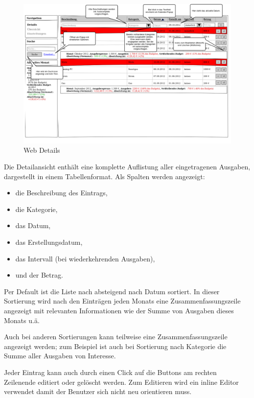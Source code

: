 \begin{figure}[htl]
\centering
\includegraphics[width=\textwidth]{img/web_details}
\caption{Web Details}
\label{fig:web_details}
\end{figure}

Die Detailansicht enthält eine komplette Auflistung aller eingetragenen Ausgaben, dargestellt
in einem Tabellenformat. Als Spalten werden angezeigt:

\begin{itemize}
    \item die Beschreibung des Eintrags,
    \item die Kategorie,
    \item das Datum,
    \item das Erstellungsdatum,
    \item das Intervall (bei wiederkehrenden Ausgaben),
    \item und der Betrag.
\end{itemize}

Per Default ist die Liste nach absteigend nach Datum sortiert. In dieser Sortierung wird nach den
Einträgen jeden Monats eine Zusammenfassungszeile angezeigt mit relevanten Informationen wie der Summe von Ausgaben dieses Monats u.ä.

Auch bei anderen Sortierungen kann teilweise eine Zusammenfassungszeile angezeigt werden; zum Beispiel ist auch
bei Sortierung nach Kategorie die Summe aller Ausgaben von Interesse.

Jeder Eintrag kann auch durch einen Click auf die Buttons am rechten Zeilenende editiert oder gelöscht werden.
Zum Editieren wird ein inline Editor verwendet damit der Benutzer sich nicht neu orientieren muss.

